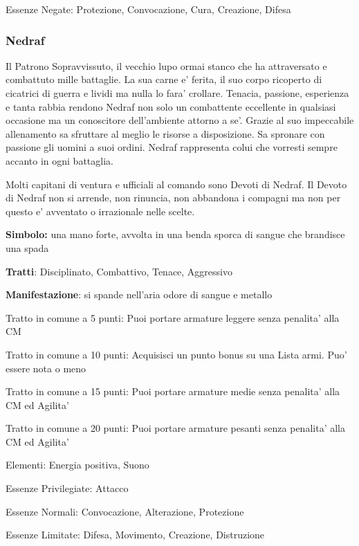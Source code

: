 \documentclass[a4paper,11pt,twoside,openany]{dndbook}
\begin{document}
{Essenze Negate: Protezione, Convocazione, Cura, Creazione, Difesa

\subsubsection{Nedraf}

\label{nedraf}

Il Patrono Sopravvissuto, il vecchio lupo ormai stanco che ha attraversato e combattuto mille battaglie. La sua carne e' ferita, il suo corpo ricoperto di cicatrici di guerra e lividi ma nulla lo fara' crollare. Tenacia, passione, esperienza e tanta rabbia rendono Nedraf non solo un combattente eccellente in qualsiasi occasione ma un conoscitore dell'ambiente attorno a se'. Grazie al suo impeccabile allenamento sa sfruttare al meglio le risorse a disposizione. Sa spronare con passione gli uomini a suoi ordini.
Nedraf rappresenta colui che vorresti sempre accanto in ogni battaglia. 

Molti capitani di ventura e ufficiali al comando sono Devoti di Nedraf. Il Devoto di Nedraf non si arrende, non rinuncia, non abbandona i compagni ma non per questo e' avventato o irrazionale nelle scelte.

\textbf{Simbolo:} una mano forte, avvolta in una benda sporca di sangue
che brandisce una spada

\textbf{Tratti}: Disciplinato, Combattivo, Tenace, Aggressivo

\textbf{Manifestazione}: si spande nell'aria odore di sangue e metallo

\bigskip

Tratto in comune a 5 punti: Puoi portare armature leggere senza penalita' alla CM

Tratto in comune a 10 punti: Acquisisci un punto bonus su una Lista armi. Puo' essere nota o meno

Tratto in comune a 15 punti: Puoi portare armature medie senza penalita' alla CM ed Agilita'

Tratto in comune a 20 punti: Puoi portare armature pesanti senza penalita' alla CM ed Agilita'

\bigskip

Elementi: Energia positiva, Suono

\bigskip

Essenze Privilegiate: Attacco

Essenze Normali: Convocazione, Alterazione, Protezione

Essenze Limitate: Difesa, Movimento, Creazione, Distruzione

}
\end{document}
